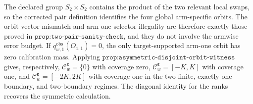 The declared group \(S_2\times S_2\) contains the product of the two relevant local swaps, so the corrected pair definition identifies the four global arm-specific orbits. The orbit-vector mismatch and arm-one selector illegality are therefore exactly those proved in \(\texttt{prop:two-pair-sanity-check}\), and they do not involve the armwise error budget. If \(q^{\mathrm{obs}}_{w,1}(O_{1,1})=0\), the only target-supported arm-one orbit has zero calibration mass. Applying \(\texttt{prop:asymmetric-disjoint-orbit-witness}\) gives, respectively, \(\mathcal C^{\boldsymbol\varepsilon}_w=\{0\}\) with coverage zero, \(\mathcal C^{\boldsymbol\varepsilon}_w=[-K,K]\) with coverage one, and \(\mathcal C^{\boldsymbol\varepsilon}_w=[-2K,2K]\) with coverage one in the two-finite, exactly-one-boundary, and two-boundary regimes. The diagonal identity for the ranks recovers the symmetric calculation.